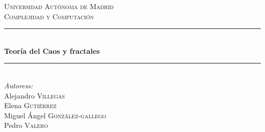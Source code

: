\newtheorem{theorem}{Teorema}[section]
\newtheorem{lemma}{Lema}[section]
\newtheorem{proposition}{Proposición}[section]
\theoremstyle{definition}
\newtheorem{definition}{Definición}[section]
\newtheorem{example}{Ejemplo}[section]

\renewcommand{\headrulewidth}{0.5pt}







\begin{titlepage}

\newcommand{\HRule}{\rule{\linewidth}{0.5mm}} %

\center %


\textsc{\LARGE Universidad Autónoma de Madrid}\\[1.5cm] %
\textsc{\Large Complejidad y Computación}\\[0.5cm] %



\HRule \\[0.4cm]
{ \huge \bfseries Teoría del Caos y fractales}\\[0.4cm] %
\HRule \\[1cm]




\Large \emph{Autoress:}\\
Alejandro \textsc{Villegas}\\ %
Elena \textsc{Gutiérrez}\\ %
Miguel Ángel \textsc{González-gallego} \\
Pedro \textsc{Valero}\\[1cm] %


\end{titlepage}
